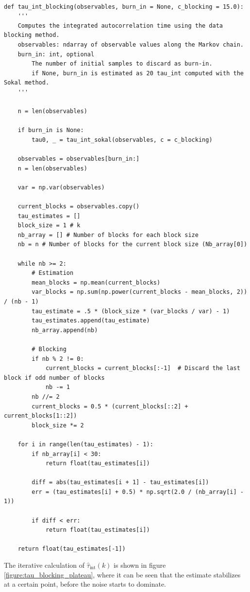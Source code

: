 \begin{verbatim}

def tau_int_blocking(observables, burn_in = None, c_blocking = 15.0):
    '''
    Computes the integrated autocorrelation time using the data blocking method.
    observables: ndarray of observable values along the Markov chain.
    burn_in: int, optional
        The number of initial samples to discard as burn-in.
        if None, burn_in is estimated as 20 tau_int computed with the Sokal method.
    '''

    n = len(observables)

    if burn_in is None:
        tau0, _ = tau_int_sokal(observables, c = c_blocking)

    observables = observables[burn_in:]
    n = len(observables)

    var = np.var(observables)

    current_blocks = observables.copy()
    tau_estimates = []
    block_size = 1 # k
    nb_array = [] # Number of blocks for each block size
    nb = n # Number of blocks for the current block size (Nb_array[0])

    while nb >= 2:
        # Estimation
        mean_blocks = np.mean(current_blocks)
        var_blocks = np.sum(np.power(current_blocks - mean_blocks, 2)) / (nb - 1)
        tau_estimate = .5 * (block_size * (var_blocks / var) - 1)
        tau_estimates.append(tau_estimate)
        nb_array.append(nb)

        # Blocking
        if nb % 2 != 0:
            current_blocks = current_blocks[:-1]  # Discard the last block if odd number of blocks
            nb -= 1
        nb //= 2
        current_blocks = 0.5 * (current_blocks[::2] + current_blocks[1::2])
        block_size *= 2
	
    for i in range(len(tau_estimates) - 1):
        if nb_array[i] < 30:
            return float(tau_estimates[i])

        diff = abs(tau_estimates[i + 1] - tau_estimates[i])
        err = (tau_estimates[i] + 0.5) * np.sqrt(2.0 / (nb_array[i] - 1)) 
        
        if diff < err:
            return float(tau_estimates[i])

    return float(tau_estimates[-1])

\end{verbatim}

The iterative calculation of $\hat{\tau}_{\text{int}}(k)$ is shown in figure \ref{figure:tau_blocking_plateau}, where it can be seen that the estimate stabilizes at a certain point, before the noise starts to dominate.

